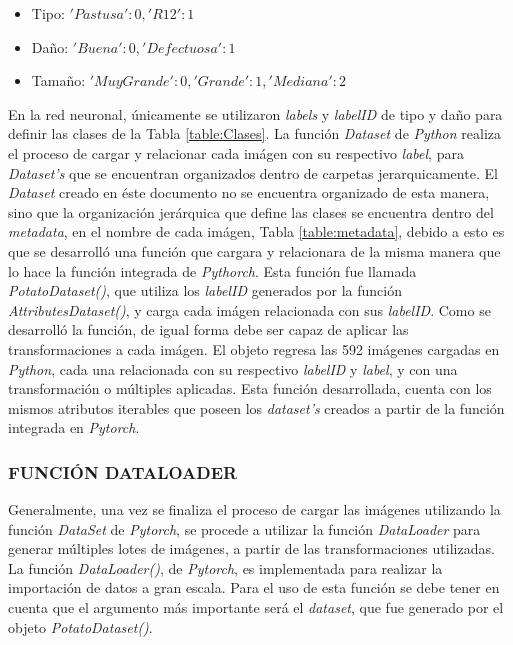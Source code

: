\begin{itemize}
	\item Tipo: ${'Pastusa': 0, 'R12': 1}$
	\item Daño: ${'Buena': 0, 'Defectuosa': 1}$
	\item Tamaño: ${'Muy Grande': 0, 'Grande': 1, 'Mediana': 2}$
\end{itemize}

En la red neuronal, únicamente se utilizaron \textit{labels} y \textit{labelID} de tipo y daño para definir las clases de la Tabla \ref{table:Clases}. La función \textit{Dataset} de \textit{Python} realiza el proceso de cargar y relacionar cada imágen con su respectivo \textit{label}, para \textit{Dataset's} que se encuentran organizados dentro de carpetas jerarquicamente. El \textit{Dataset} creado en éste documento no se encuentra organizado de esta manera, sino que la organización jerárquica que define las clases se encuentra dentro del \textit{metadata}, en el nombre de cada imágen, Tabla \ref{table:metadata}, debido a esto es que se desarrolló una función que cargara y relacionara de la misma manera que lo hace la función integrada de \textit{Pythorch}. Esta función fue llamada \textit{PotatoDataset()}, que utiliza los \textit{labelID} generados por la función \textit{AttributesDataset()}, y carga cada imágen relacionada con sus \textit{labelID}. Como se desarrolló la función, de igual forma debe ser capaz de aplicar las transformaciones a cada imágen. El objeto regresa las 592 imágenes cargadas en \textit{Python}, cada una relacionada con su respectivo \textit{labelID} y \textit{label}, y con una transformación o múltiples aplicadas. Esta función desarrollada, cuenta con los mismos atributos iterables que poseen los \textit{dataset's} creados a partir de la función integrada en \textit{Pytorch}.			


\subsubsection{FUNCIÓN DATALOADER}			

Generalmente, una vez se finaliza el proceso de cargar las imágenes utilizando la función \textit{DataSet} de \textit{Pytorch}, se procede a utilizar la función \textit{DataLoader} para generar múltiples lotes de imágenes, a partir de las transformaciones utilizadas. La función \textit{DataLoader()}, de \textit{Pytorch}, es implementada para realizar la importación de datos a gran escala. Para el uso de esta función se debe tener en cuenta que el argumento más importante será el \textit{dataset}, que fue generado por el objeto \textit{PotatoDataset()}. \\


